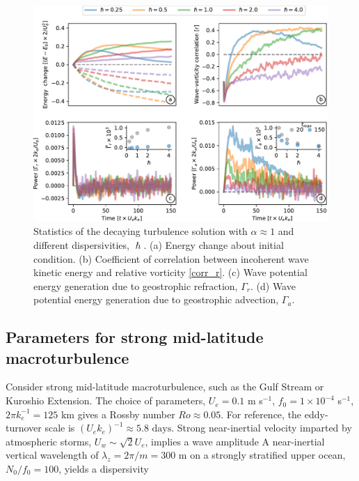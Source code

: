 \documentclass{jfm}
\begin{document}
 \begin{figure}
 \label{stats_turb_various}
 \centering
 \includegraphics[width=1.\textwidth]{figs/fig6.pdf}
 \caption{Statistics of the decaying turbulence solution with $\alpha \approx 1$ and
         different dispersivities, $\hslash$. (a) Energy change about initial condition.
         (b) Coefficient of correlation between
         incoherent wave
         kinetic energy and relative vorticity \eqref{corr_r}. (c) Wave potential
         energy generation
         due to geostrophic refraction, $\Gamma_r$. (d) Wave potential energy generation due
         to geostrophic advection, $\Gamma_a$.
         }
 \end{figure}



\subsection{Parameters for strong mid-latitude macroturbulence}

Consider strong mid-latitude macroturbulence, such as the Gulf Stream or Kuroshio
Extension. The choice of parameters, $U_e = 0.1$ m s$^{-1}$,
$f_0 = 1 \times 10^{-4}$ s$^{-1}$, $2\pi k_e^{-1} = 125$ km
gives a Rossby number $Ro \approx  0.05$. For reference, the eddy-turnover scale
is $(U_e k_e)^{-1}\approx 5.8\,\,\text{days}$. Strong near-inertial velocity
imparted by atmospheric storms, $U_w \sim \sqrt{2} U_e$, implies a wave amplitude
\beq
  \alpha {}\per
\eeq
A near-inertial vertical wavelength of $\lambda_z = 2\pi/m = 300$ m \citep[e.g., ][]{alford_etal2016}
on a strongly stratified upper ocean, $N_0/f_0 = 100$, yields a dispersivity
\beq
  \hslash {} \per
\eeq
\end{document}
